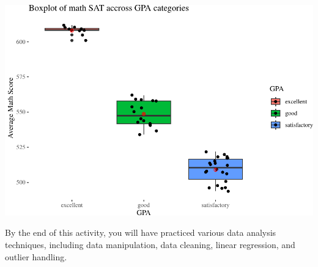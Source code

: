 \documentclass[
]{book}
\begin{document}
\includegraphics[width=1\linewidth]{Class_Activity_25_files/figure-latex/unnamed-chunk-16-1}

By the end of this activity, you will have practiced various data analysis techniques, including data manipulation, data cleaning, linear regression, and outlier handling.

  
\end{document}
